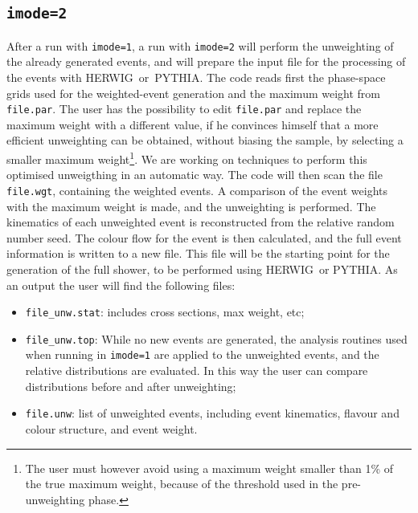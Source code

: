 \documentclass[paper]{JHEP3}
\def\herwig{{\small HERWIG}}
\def\pythia{{\small PYTHIA}}
\begin{document}
\begin{appendix}
\subsection{{\tt imode=2}}
After a run with {\tt imode=1}, a run with {\tt imode=2} will perform
the unweighting of the already generated events, and will prepare the
input file for the processing of the events with \herwig~or~\pythia.  
The code
reads first the phase-space grids used for the weighted-event
generation and
 the maximum weight from {\tt file.par}. The user has the possibility
 to edit {\tt file.par} and replace the maximum weight with a
 different value, if he convinces himself that a more efficient
 unweighting can be obtained, without biasing the sample, by selecting a
 smaller maximum weight\footnote{The user must however avoid
  using a maximum weight smaller than 1\% of
  the true maximum weight, because of the threshold used in 
the pre-unweighting phase.}. We are working on techniques to perform
this optimised unweigthing in an automatic way. The code will then scan the
file {\tt file.wgt}, containing the weighted events. A comparison of
the event weights with the maximum weight is made, and the unweighting
is performed. The kinematics of each unweighted event is reconstructed
from the relative random number seed. The colour flow for the event is
then calculated, and the full event information is written to a new
file. This file will be the starting point for the generation of the
full shower, to be performed using \herwig\ or \pythia.  As an output the user will
find the following files:
\begin{itemize}
\item {\tt file\_unw.stat}: includes cross sections, max weight, etc;
\item {\tt file\_unw.top}: While no new events are generated, the analysis
  routines used when running in {\tt imode=1} are applied to the
  unweighted events, and the relative distributions are evaluated. In
  this way the user can compare distributions before and after unweighting;
\item {\tt file.unw}: list of unweighted events, including event
  kinematics, flavour and colour structure, and event weight.
\end{itemize}


\end{appendix}
\end{document}

